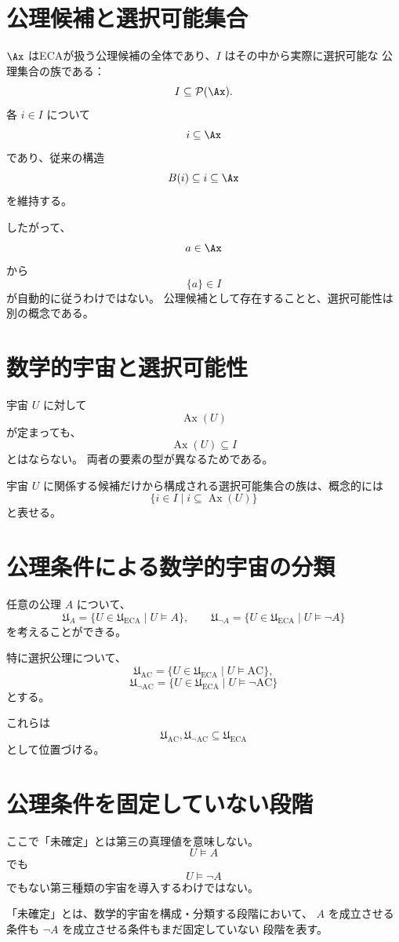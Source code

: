 \documentclass[11pt,a4paper]{article}
\begin{document}
\section{公理候補と選択可能集合}
\(\Ax\) はECAが扱う公理候補の全体であり、\(I\) はその中から実際に選択可能な
公理集合の族である：
\[
I\subseteq\mathcal{P}(\Ax).
\]
各 \(i\in I\) について
\[
i\subseteq\Ax
\]
であり、従来の構造
\[
B(i)\subseteq i\subseteq\Ax
\]
を維持する。

したがって、
\[
a\in\Ax
\]
から
\[
\{a\}\in I
\]
が自動的に従うわけではない。
公理候補として存在することと、選択可能性は別の概念である。

\section{数学的宇宙と選択可能性}
宇宙 \(U\) に対して
\[
\operatorname{Ax}(U)
\]
が定まっても、
\[
\operatorname{Ax}(U)\subseteq I
\]
とはならない。
両者の要素の型が異なるためである。

宇宙 \(U\) に関係する候補だけから構成される選択可能集合の族は、概念的には
\[
\{i\in I\mid i\subseteq\operatorname{Ax}(U)\}
\]
と表せる。

\section{公理条件による数学的宇宙の分類}
任意の公理 \(A\) について、
\[
\mathfrak{U}_A
=
\{U\in\mathfrak{U}_{\mathrm{ECA}}\mid U\models A\},
\qquad
\mathfrak{U}_{\neg A}
=
\{U\in\mathfrak{U}_{\mathrm{ECA}}\mid U\models\neg A\}
\]
を考えることができる。

特に選択公理について、
\[
\mathfrak{U}_{\mathrm{AC}}
=
\{U\in\mathfrak{U}_{\mathrm{ECA}}\mid U\models\mathrm{AC}\},
\]
\[
\mathfrak{U}_{\neg\mathrm{AC}}
=
\{U\in\mathfrak{U}_{\mathrm{ECA}}\mid U\models\neg\mathrm{AC}\}
\]
とする。

これらは
\[
\mathfrak{U}_{\mathrm{AC}},
\mathfrak{U}_{\neg\mathrm{AC}}
\subseteq\mathfrak{U}_{\mathrm{ECA}}
\]
として位置づける。

\section{公理条件を固定していない段階}
ここで「未確定」とは第三の真理値を意味しない。
\[
U\models A
\]
でも
\[
U\models\neg A
\]
でもない第三種類の宇宙を導入するわけではない。

「未確定」とは、数学的宇宙を構成・分類する段階において、
\(A\) を成立させる条件も \(\neg A\) を成立させる条件もまだ固定していない
段階を表す。
\end{document}
